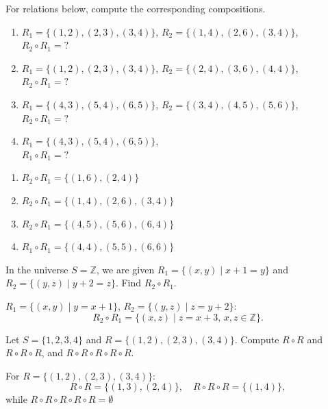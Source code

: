 \documentclass[11pt,paper=b5,footinclude,headinclude]{scrbook} %
\theoremstyle{remark}
\theoremstyle{definition} %
\theoremstyle{theorem} %
\newtheorem{ex}{Exercise\hypertarget{sol:\theex}}[chapter]
\begin{document}
\begin{ex}For relations below, compute the corresponding compositions.
\begin{enumerate}
    \item \(R_1 = \{(1, 2), (2, 3), (3, 4)\}\), \(R_2 = \{(1, 4), (2, 6), (3, 4)\}\),\\ 
    \(R_2 \circ R_1 = ?\)
    \item \(R_1 = \{(1, 2), (2, 3), (3, 4)\}\), \(R_2 = \{(2, 4), (3, 6), (4, 4)\}\), \\
    \(R_2 \circ R_1 = ?\)
    \item \(R_1 = \{(4, 3), (5, 4), (6, 5)\}\), \(R_2 = \{(3, 4), (4, 5), (5, 6)\}\), \\
    \(R_2 \circ R_1 = ?\)
    \item \(R_1 = \{(4, 3), (5, 4), (6, 5)\}\), \\
    \(R_1 \circ R_1 = ?\)
    
\end{enumerate}
\begin{sol}
    \begin{enumerate}
        \item \(R_2 \circ R_1 = \{(1, 6), (2, 4)\}\)
        \item \(R_2 \circ R_1 = \{(1, 4), (2, 6), (3, 4)\}\)
        \item \(R_2 \circ R_1 = \{(4, 5), (5, 6), (6, 4)\}\)
        \item \(R_1 \circ R_1 = \{(4, 4), (5, 5), (6, 6)\}\)
    \end{enumerate}
\end{sol}
\end{ex}

\begin{ex}
    In the universe $S=\mathbb Z$, we are given \(R_1 = \{(x, y) \mid x + 1 = y\}\) and \(R_2 = \{(y, z) \mid y + 2 = z\}\). Find \(R_2 \circ R_1\).

    \begin{sol}
    \(R_1 = \{(x, y) \mid y = x + 1\}\), \(R_2 = \{(y, z) \mid z = y + 2\}\):
    \[
    R_2 \circ R_1 = \{(x, z) \mid z = x + 3, \, x, z \in \mathbb{Z}\}.
    \]
    \end{sol}
\end{ex}
\begin{ex}
    Let \(S = \{1, 2, 3, 4\}\) and \(R = \{(1, 2), (2, 3), (3, 4)\}\). Compute \(R \circ R\) and \(R \circ R \circ R\), and \(R \circ R \circ R \circ R \circ R\).
    \begin{sol}
        For \(R = \{(1, 2), (2, 3), (3, 4)\}\):
    \[
    R \circ R = \{(1, 3), (2, 4)\}, \quad R \circ R \circ R = \{(1, 4)\},
    \]
    while \(R \circ R \circ R \circ R \circ R=\emptyset\)
    \end{sol}
\end{ex}
\end{document}
